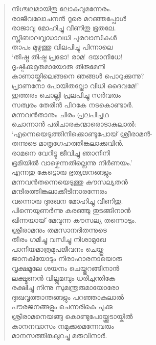 \begin{verse}
നിശ്ചലമായിതു ലോകവുമന്നേരം.\\
രാജീവലോചനന്‍ ദൂരെ മറഞ്ഞപ്പോള്‍\\
രാജാവു മോഹിച്ചു വീണിതു ഭൂതലേ.\\
സ്ത്രീബാലവൃദ്ധാവധി പുരവാസികള്‍\\
താപം മുഴുത്തു വിലപിച്ചു പിന്നാലെ\\
‘തിഷ്ഠ തിഷ്ഠ പ്രഭോ! രാമ! ദയാനിധേ!\\
ദൃഷ്ടിക്കമൃതമായോരു തിരുമേനി\\
കാണായ്കിലെങ്ങനെ ഞങ്ങള്‍ പൊറുക്കുന്നു?\\
പ്രാണനോ പോയിതല്ലോ വിധി ദൈവമേ!’\\
ഇത്തരം ചൊല്ലി പ്രലപിച്ചു സര്‍വരും\\
സത്വരം തേരിന്‍ പിറകേ നടകൊണ്ടാര്‍.\\
മന്നവന്‍താനും ചിരം പ്രലപിച്ചഥ\\
ചൊന്നാന്‍ പരിചാരകന്മാരൊടാകുലാല്‍:\\
‘എന്നെയെടുത്തിനിക്കൊണ്ടുപോയ് ശ്രീരാമന്‍-\\
തന്നുടെ മാതൃഗേഹത്തിങ്കലാക്കുവിന്‍.\\
രാമനെ വേറിട്ടു ജീവിച്ചു ഞാനിനി\\
ഭൂമിയില്‍ വാഴ്കെന്നതില്ലെന്നു നിര്‍ണയം.’\\
എന്നതു കേട്ടൊരു ഭൃത്യജനങ്ങളും\\
മന്നവന്‍തന്നെയെടുത്തു കൗസല്യതന്‍\\
മന്ദിരത്തിങ്കലാക്കീടിനാരന്നേരം\\
വന്നൊരു ദുഃഖേന മോഹിച്ചു വീണിതു.\\
പിന്നെയുണര്‍ന്നു കരഞ്ഞു തുടങ്ങിനാന്‍\\
ഖിന്നയായ് മേവുന്ന കൗസല്യ തന്നൊടും.\\
ശ്രീരാമനും തമസാനദിതന്നുടെ\\
തീരം ഗമിച്ചു വസിച്ചു നിശാമുഖേ\\
പാനീയമാത്രമുപജീവനം ചെയ്തു\\
ജാനകിയോടും നിരാഹാരനായൊരു\\
വൃക്ഷമൂലേ ശയനം ചെയ്തുറങ്ങിനാന്‍\\
ലക്ഷ്മണന്‍ വില്ലുമമ്പും ധരിച്ചന്തികേ\\
രക്ഷിച്ചു നിന്നു സുമന്ത്രരുമായോരോ\\
ദുഃഖവൃത്താന്തങ്ങളും പറഞ്ഞാകുലാല്‍\\
പൗരജനങ്ങളും ചെന്നരികെ പുക്കു\\
ശ്രീരാമനെയങ്ങു കൊണ്ടുപോയ്ക്കൂടായ്കില്‍\\
കാനനവാസം നമുക്കുമെന്നേവരും\\
മാനസത്തിങ്കലുറച്ചു മരുവിനാര്‍.\\

\end{verse}
